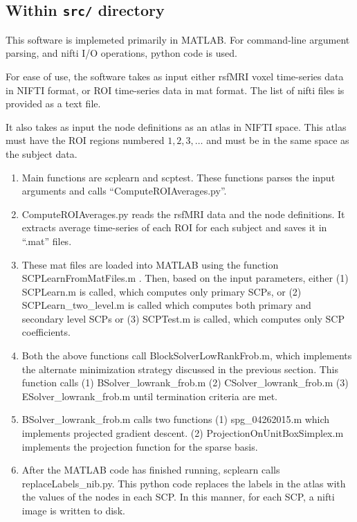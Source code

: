 \documentclass[12pt]{article}
\begin{document}
\subsection{Within \texttt{src/} directory}
This software is implemeted primarily in MATLAB. For command-line argument parsing, and nifti I/O operations, python code is used.

For ease of use, the software takes as input either rsfMRI voxel time-series data in NIFTI format, or ROI time-series data in mat format. The list of nifti files is provided as a text file. 

It also takes as input the node definitions as an atlas in NIFTI space. This atlas must have the ROI regions numbered $1, 2, 3, \ldots$ and must be in the same space as the subject data. 

\begin{enumerate}
\item Main functions are {\color{blue}scplearn} and {\color{blue}scptest}. These functions parses the input arguments and calls ``ComputeROIAverages.py''.
\item {\color{blue}ComputeROIAverages.py} reads the rsfMRI data and the node definitions. It extracts average time-series of each ROI for each subject and saves it in ``.mat'' files.
\item These mat files are loaded into MATLAB using the function {\color{magenta}SCPLearnFromMatFiles.m} . Then, based on the input parameters, either (1) {\color{magenta}SCPLearn.m} is called, which computes only primary SCPs,  or (2) {\color{magenta}SCPLearn\_two\_level.m} is called which computes both primary and secondary level SCPs or (3) {\color{magenta}SCPTest.m} is called, which computes only SCP coefficients.
\item Both the above functions call {\color{magenta}BlockSolverLowRankFrob.m}, which implements the alternate minimization strategy discussed in the previous section. This function calls (1) {\color{magenta}BSolver\_lowrank\_frob.m} (2)  {\color{magenta}CSolver\_lowrank\_frob.m}  (3)  {\color{magenta}ESolver\_lowrank\_frob.m} until termination criteria are met.
\item {\color{magenta}BSolver\_lowrank\_frob.m} calls two functions (1) {\color{magenta}spg\_04262015.m} which implements projected gradient descent. (2) {\color{magenta}ProjectionOnUnitBoxSimplex.m} implements the projection function for the sparse basis.
\item After the MATLAB code has finished running, {\color{blue}scplearn} calls {\color{blue}replaceLabels\_nib.py}. This python code replaces the labels in the atlas with the values of the nodes in each SCP. In this manner, for each SCP, a nifti image is written to disk.

\end{enumerate}
\end{document}
